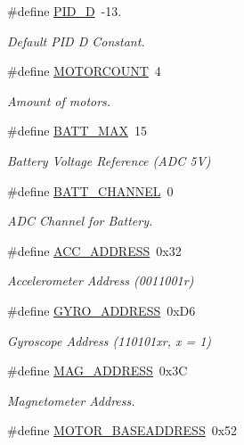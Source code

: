 \begin{DoxyCompactItemize}
\#define \hyperlink{group__config_ga2a442b8579a5c5f9526e824165125497}{P\-I\-D\-\_\-\-D}~-\/13.
\begin{DoxyCompactList}\small\item\em Default P\-I\-D D Constant. \end{DoxyCompactList}\item 
\#define \hyperlink{group__config_ga1a2c496f8bb7dbb5f1dfef5c32624a6d}{M\-O\-T\-O\-R\-C\-O\-U\-N\-T}~4
\begin{DoxyCompactList}\small\item\em Amount of motors. \end{DoxyCompactList}\item 
\#define \hyperlink{group__config_gac873c87f494ea2b22e7eb5fc74ad5a82}{B\-A\-T\-T\-\_\-\-M\-A\-X}~15
\begin{DoxyCompactList}\small\item\em Battery Voltage Reference (A\-D\-C 5\-V) \end{DoxyCompactList}\item 
\#define \hyperlink{group__config_ga9fd748b19523c96052a2964d73a7b0f5}{B\-A\-T\-T\-\_\-\-C\-H\-A\-N\-N\-E\-L}~0
\begin{DoxyCompactList}\small\item\em A\-D\-C Channel for Battery. \end{DoxyCompactList}\item 
\#define \hyperlink{group__config_ga27341a8e1cb1a6ace5a5cf3caea1c99f}{A\-C\-C\-\_\-\-A\-D\-D\-R\-E\-S\-S}~0x32
\begin{DoxyCompactList}\small\item\em Accelerometer Address (0011001r) \end{DoxyCompactList}\item 
\#define \hyperlink{group__config_ga8ed1f343e82440b4ef900e5fe42d74f0}{G\-Y\-R\-O\-\_\-\-A\-D\-D\-R\-E\-S\-S}~0x\-D6
\begin{DoxyCompactList}\small\item\em Gyroscope Address (110101xr, x = 1) \end{DoxyCompactList}\item 
\#define \hyperlink{group__config_gade4e63fac819c67040e374f08d2d7230}{M\-A\-G\-\_\-\-A\-D\-D\-R\-E\-S\-S}~0x3\-C
\begin{DoxyCompactList}\small\item\em Magnetometer Address. \end{DoxyCompactList}\item 
\#define \hyperlink{group__config_ga6e8ab18bbb1ef1b1e929c627f18224a3}{M\-O\-T\-O\-R\-\_\-\-B\-A\-S\-E\-A\-D\-D\-R\-E\-S\-S}~0x52

\end{DoxyCompactItemize}
